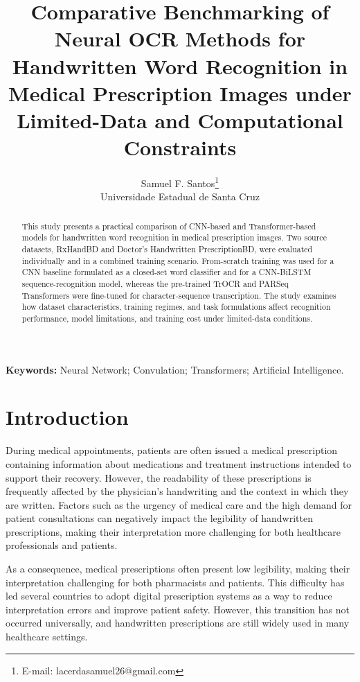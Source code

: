 \documentclass[11pt,a4paper]{article}
\title{Comparative Benchmarking of Neural OCR Methods for Handwritten Word Recognition in Medical Prescription Images under Limited-Data and Computational Constraints}
\author{
  Samuel F. Santos\thanks{E-mail: lacerdasamuel26@gmail.com}
  \\ Universidade Estadual de Santa Cruz
}
\date{} %
\begin{document}
\maketitle

\begin{abstract}

This study presents a practical comparison of CNN-based and Transformer-based models for handwritten word recognition in medical prescription images. Two source datasets, RxHandBD and Doctor’s Handwritten PrescriptionBD, were evaluated individually and in a combined training scenario. From-scratch training was used for a CNN baseline formulated as a closed-set word classifier and for a CNN-BiLSTM sequence-recognition model, whereas the pre-trained TrOCR and PARSeq Transformers were fine-tuned for character-sequence transcription. The study examines how dataset characteristics, training regimes, and task formulations affect recognition performance, model limitations, and training cost under limited-data conditions.
\end{abstract}

\noindent\textbf{Keywords:} Neural Network; Convulation; Transformers; Artificial Intelligence.

\section{Introduction}
\label{sec:introduction}





During medical appointments, patients are often issued a medical prescription containing information about medications and treatment instructions intended to support their recovery. However, the readability of these prescriptions is frequently affected by the physician's handwriting and the context in which they are written. Factors such as the urgency of medical care and the high demand for patient consultations can negatively impact the legibility of handwritten prescriptions, making their interpretation more challenging for both healthcare professionals and patients.

As a consequence, medical prescriptions often present low legibility, making their interpretation challenging for both pharmacists and patients. This difficulty has led several countries to adopt digital prescription systems as a way to reduce interpretation errors and improve patient safety. However, this transition has not occurred universally, and handwritten prescriptions are still widely used in many healthcare settings.
\end{document}
